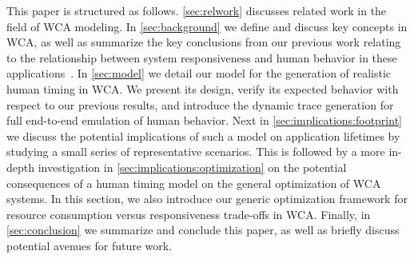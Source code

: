 \medskip

This paper is structured as follows.
\cref{sec:relwork} discusses related work in the field of \acl{WCA} modeling.
In \cref{sec:background} we define and discuss key concepts in \ac{WCA}, as well as summarize the key conclusions from our previous work relating to the relationship between system responsiveness and human behavior in these applications~\cite{olguinmunoz:impact2021}.
In \cref{sec:model} we detail our model for the generation of realistic human timing in \ac{WCA}.
We present its design, verify its expected behavior with respect to our previous results, and introduce the dynamic trace generation for full end-to-end emulation of human behavior.
Next in \cref{sec:implications:footprint} we discuss the potential implications of such a model on application lifetimes by studying a small series of representative scenarios.
This is followed by a more in-depth investigation in \cref{sec:implications:optimization} on the potential consequences of a human timing model on the general optimization of \ac{WCA} systems.
In this section, we also introduce our generic optimization framework for resource consumption versus responsiveness trade-offs in \ac{WCA}.
Finally, in \cref{sec:conclusion} we summarize and conclude this paper, as well as briefly discuss potential avenues for future work.
